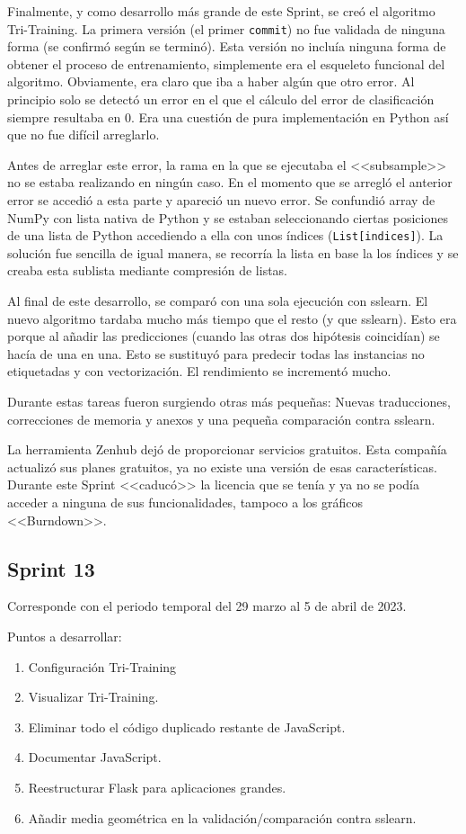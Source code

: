 Finalmente, y como desarrollo más grande de este Sprint, se creó el algoritmo
Tri-Training. La primera versión (el primer \texttt{commit}) no fue validada de
ninguna forma (se confirmó según se terminó). Esta versión no incluía ninguna
forma de obtener el proceso de entrenamiento, simplemente era el esqueleto
funcional del algoritmo. Obviamente, era claro que iba a haber algún que otro
error. Al principio solo se detectó un error en el que el cálculo del error de
clasificación siempre resultaba en 0. Era una cuestión de pura implementación en
Python así que no fue difícil arreglarlo.

Antes de arreglar este error, la rama en la que se ejecutaba el <<subsample>> no
se estaba realizando en ningún caso. En el momento que se arregló el anterior
error se accedió a esta parte y apareció un nuevo error. Se confundió array de
NumPy con lista nativa de Python y se estaban seleccionando ciertas posiciones
de una lista de Python accediendo a ella con unos índices
(\texttt{List{[}indices{]}}). La solución fue sencilla de igual manera, se
recorría la lista en base la los índices y se creaba esta sublista mediante
compresión de listas.

Al final de este desarrollo, se comparó con una sola ejecución con sslearn. El
nuevo algoritmo tardaba mucho más tiempo que el resto (y que sslearn). Esto era
porque al añadir las predicciones (cuando las otras dos hipótesis coincidían) se
hacía de una en una. Esto se sustituyó para predecir todas las instancias no
etiquetadas y con vectorización. El rendimiento se incrementó mucho.

Durante estas tareas fueron surgiendo otras más pequeñas: Nuevas traducciones,
correcciones de memoria y anexos y una pequeña comparación contra sslearn.

La herramienta Zenhub dejó de proporcionar servicios gratuitos. Esta compañía
actualizó sus planes gratuitos, ya no existe una versión de esas
características. Durante este Sprint <<caducó>> la licencia que se tenía y ya no
se podía acceder a ninguna de sus funcionalidades, tampoco a los gráficos
<<Burndown>>.

\subsection{Sprint 13}
Corresponde con el periodo temporal del 29 marzo al 5 de abril de 2023.

Puntos a desarrollar:
\begin{enumerate}
    \item Configuración Tri-Training
    \item Visualizar Tri-Training.
    \item Eliminar todo el código duplicado restante de JavaScript.
    \item Documentar JavaScript.
    \item Reestructurar Flask para aplicaciones grandes.
    \item Añadir media geométrica en la validación/comparación contra sslearn.
\end{enumerate}

